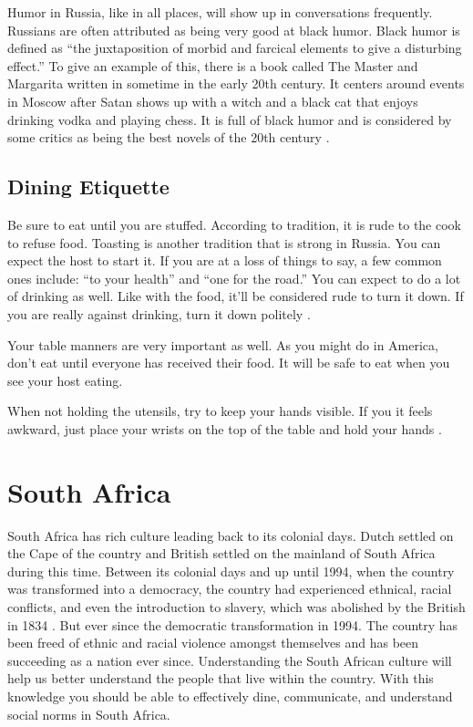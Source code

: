 \documentclass[11pt,a4paper,twoside]{report}
\begin{document}
Humor in Russia, like in all places, will show up in conversations frequently.
Russians are often attributed as being very good at black humor. Black humor is
defined as “the juxtaposition of morbid and farcical elements to give a
disturbing effect.” To give an example of this, there is a book called The
Master and Margarita written in sometime in the early 20th century. It centers
around events in Moscow after Satan shows up with a witch and a black cat that
enjoys drinking vodka and playing chess. It is full of black humor and is
considered by some critics as being the best novels of the 20th century \citep*{bulgakov}.

\section{Dining Etiquette}

Be sure to eat until you are stuffed. According to tradition, it is rude to the
cook to refuse food. Toasting is another tradition that is strong in Russia.
You can expect the host to start it. If you are at a loss of things to say, a
few common ones include: “to your health” and “one for the road.” You can
expect to do a lot of drinking as well. Like with the food, it'll be considered
rude to turn it down. If you are really against drinking, turn it down politely
\citep*{russianDining1}.

Your table manners are very important as well. As you might do in America,
don't eat until everyone has received their food. It will be safe to eat when
you see your host eating.

When not holding the utensils, try to keep your hands visible. If you it feels
awkward, just place your wrists on the top of the table and hold your hands
\citep*{russianDining2}.



\chapter{South Africa}

South Africa has rich culture leading back to its colonial days. Dutch settled
on the Cape of the country and British settled on the mainland of South Africa
during this time. Between its colonial days and up until 1994, when the country
was transformed into a democracy, the country had experienced ethnical, racial
conflicts, and even the introduction to slavery, which was abolished by the
British in 1834 \citep*{coplan}. But ever since the democratic transformation in
1994. The country has been freed of ethnic and racial violence amongst
themselves and has been succeeding as a nation ever since. Understanding the
South African culture will help us better understand the people that live
within the country. With this knowledge you should be able to effectively dine,
communicate, and understand social norms in South Africa.
\end{document}
